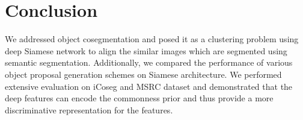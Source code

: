 \documentclass[conference]{IEEEtran}
\begin{document}
\section{Conclusion} \label{sec:conclusion}
We addressed object cosegmentation and posed it as a clustering problem using deep Siamese network to align the similar images which are segmented using semantic segmentation. Additionally, we compared the performance of various object proposal generation schemes on Siamese architecture. We performed extensive evaluation on iCoseg and MSRC dataset and demonstrated that the deep features can encode the commonness prior and thus provide a more discriminative representation for the features.  



\end{document}
